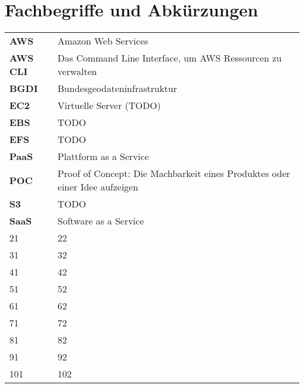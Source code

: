 \section{Fachbegriffe und Abkürzungen}
\begin{tabular}{ll}
    \textbf{AWS} & Amazon Web Services\\
    \textbf{AWS CLI} & Das Command Line Interface, um AWS Ressourcen zu verwalten\\
    \textbf{BGDI} & Bundesgeodateninfrastruktur\\
    \textbf{EC2} & Virtuelle Server (TODO)\\
    \textbf{EBS} & TODO\\
    \textbf{EFS} & TODO\\
	\textbf{PaaS} & Plattform as a Service\\
	\textbf{POC} & Proof of Concept: Die Machbarkeit eines Produktes oder einer Idee aufzeigen\\
	\textbf{S3} & TODO\\
	\textbf{SaaS} & Software as a Service\\
	21 & 22\\
	31 & 32\\
	41 & 42\\
	51 & 52\\
	61 & 62\\
	71 & 72\\
	81 & 82\\
	91 & 92\\
	101 & 102\\
\end{tabular}
